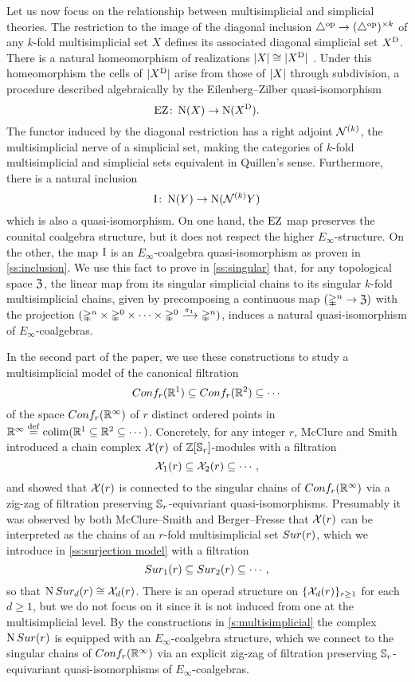 Let us now focus on the relationship between multisimplicial and simplicial theories.
The restriction to the image of the diagonal inclusion $\triangle^{\mathrm{op}} \to (\triangle^{\mathrm{op}})^{\times k}$ of any $k$-fold multisimplicial set $X$ defines its associated diagonal simplicial set $X^{\mathrm{D}}$.
There is a natural homeomorphism of realizations $\lvert X\rvert \cong \lvert X^{\mathrm{D}}\rvert$
\cite{quillen2010higheralgktheory}.
Under this homeomorphism the cells of $\lvert X^{\mathrm{D}}\rvert$ arise from those of $\lvert X\rvert$ through subdivision, a procedure described algebraically by the Eilenberg--Zilber quasi-isomorphism
\[
\operatorname{EZ} \colon \operatorname{N}(X) \to \operatorname{N}(X^{\mathrm{D}}).
\]
The functor induced by the diagonal restriction has a right adjoint $\mathcal{N}^{(k)}$, the multisimplicial nerve of a simplicial set, making the categories of $k$-fold multisimplicial and simplicial sets equivalent in Quillen's sense.
Furthermore, there is a natural inclusion
\[
\operatorname{I} \colon \operatorname{N}(Y) \to \operatorname{N}(\mathcal{N}^{(k)} Y)
\]
which is also a quasi-isomorphism.
On one hand, the $\operatorname{EZ}$ map preserves the counital coalgebra structure, but it does not respect the higher $E_\infty$-structure.
On the other, the map $\operatorname{I}$ is an $E_\infty$-coalgebra quasi-isomorphism as proven in \cref{ss:inclusion}.
We use this fact to prove in \cref{ss:singular} that, for any topological space $\mathfrak{Z}$, the linear map from its singular simplicial chains to its singular $k$-fold multisimplicial chains, given by precomposing a continuous map $(\mathbb{\Delta}^n \to \mathfrak{Z})$ with the projection $(\mathbb{\Delta}^n \times \mathbb{\Delta}^{0}\times\dots\times\mathbb{\Delta}^{0} \xrightarrow{\pi_1} \mathbb{\Delta}^n)$, induces a natural quasi-isomorphism of $E_\infty$-coalgebras.

In the second part of the paper, we use these constructions to study a multisimplicial model of the canonical filtration
\[
Conf_{r}(\mathbb{R}^{1}) \subseteq Conf_{r}(\mathbb{R}^{2}) \subseteq \dotsb
\]
of the space $Conf_{r}(\mathbb{R}^{\infty})$ of $r$ distinct ordered points in $\mathbb{R}^\infty \stackrel{\mathrm{def}}{=} \operatorname*{colim} (\mathbb{R}^1 \subseteq \mathbb{R}^2 \subseteq \dotsb)$.
Concretely, for any integer $r$, McClure and Smith \cite{mcclure2003multivariable} introduced a chain complex $\mathcal{X}(r)$ of $\mathbb{Z}[\mathbb{S}_r]$-modules with a filtration
\[
\mathcal{X}_{1}(r) \subseteq \mathcal{X}_{2}(r) \subseteq \dotsb \,,
\]
and showed that $\mathcal{X}(r)$ is connected to the singular chains of $Conf_{r}(\mathbb{R}^{\infty})$ via a zig-zag of filtration preserving $\mathbb{S}_r$-equivariant quasi-isomorphisms.
Presumably it was observed by both McClure--Smith and Berger--Fresse that $\mathcal{X}(r)$ can be interpreted as the chains of an $r$-fold multisimplicial set $Sur(r)$, which we introduce in \cref{ss:surjection model} with a filtration
\[
Sur_{1}(r) \subseteq Sur_{2}(r) \subseteq \dotsb \,,
\]
so that $\operatorname{N}Sur_{d}(r) \cong \mathcal{X}_{d}(r)$.
There is an operad structure on $\{\mathcal{X}_{d}(r)\}_{r \geq 1}$ for each $d \geq 1$, but we do not focus on it since it is not induced from one at the multisimplicial level.
By the constructions in \cref{s:multisimplicial} the complex $\operatorname{N}Sur(r)$ is equipped with an $E_\infty$-coalgebra structure, which we connect to the singular chains of $Conf_{r}(\mathbb{R}^{\infty})$ via an explicit zig-zag of filtration preserving $\mathbb{S}_r$-equivariant quasi-isomorphisms of $E_\infty$-coalgebras.

